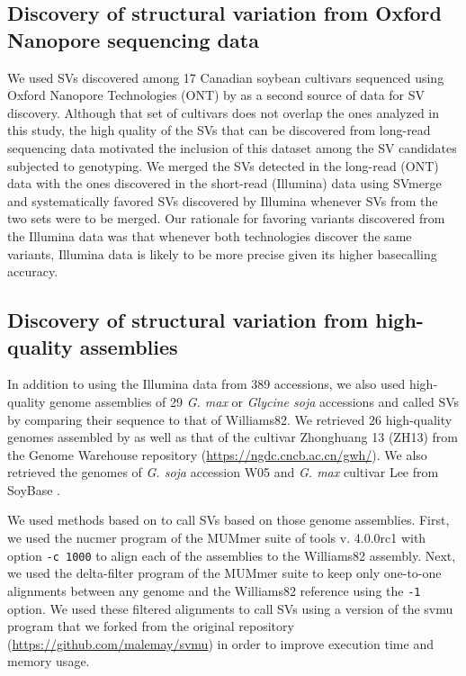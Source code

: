 \subsection*{Discovery of structural variation from Oxford Nanopore sequencing data}
\label{sv-gwas-sv-discovery-ont}

We used SVs discovered among 17 Canadian soybean cultivars sequenced using
Oxford Nano\-pore Technologies (ONT) by \cite{lemay2022} as a second source of
data for SV discovery.  Although that set of cultivars does not overlap the
ones analyzed in this study, the high quality of the SVs that can be discovered
from long-read sequencing data motivated the inclusion of this dataset among
the SV candidates subjected to genotyping.  We merged the SVs detected in the
long-read (ONT) data with the ones discovered in the short-read (Illumina) data
using SVmerge and systematically favored SVs discovered by Illumina whenever
SVs from the two sets were to be merged.  Our rationale for favoring variants
discovered from the Illumina data was that whenever both technologies discover
the same variants, Illumina data is likely to be more precise given its higher
basecalling accuracy.

\subsection*{Discovery of structural variation from high-quality assemblies}
\label{sv-gwas-sv-discovery-assembly}

In addition to using the Illumina data from 389 accessions, we also used
high-quality genome assemblies of 29 \emph{G. max} or \emph{Glycine soja}
accessions and called SVs by comparing their sequence to that of Williams82. We
retrieved 26 high-quality genomes assembled by \cite{liu2020-pangenome} as well
as that of the cultivar Zhonghuang 13 (ZH13) from the Genome Warehouse
repository (\url{https://ngdc.cncb.ac.cn/gwh/}).  We also retrieved the genomes
of \emph{G. soja} accession W05 and \emph{G. max} cultivar Lee from SoyBase
\citep{grant2010}.

We used methods based on \cite{liu2020-pangenome} to call SVs based on those
genome assemblies.  First, we used the nucmer program of the MUMmer suite of
tools v. 4.0.0rc1 \citep{marcais2018} with option \texttt{-c 1000} to align
each of the assemblies to the Williams82 assembly. Next, we used the
delta-filter program of the MUMmer suite to keep only one-to-one alignments
between any genome and the Williams82 reference using the \texttt{-1} option.
We used these filtered alignments to call SVs using a version of the svmu
program \citep{chakraborty2019} that we forked from the original repository
(\url{https://github.com/malemay/svmu}) in order to improve execution time and
memory usage.

